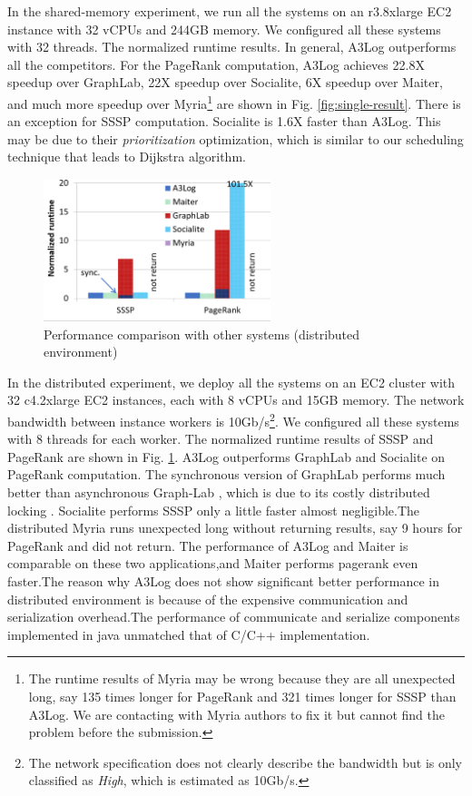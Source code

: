 In the shared-memory experiment, we run all the systems on an r3.8xlarge EC2 instance with 32 vCPUs and 244GB memory. We configured all these systems with 32 threads. The normalized runtime results. In general, A3Log outperforms all the competitors. For the PageRank computation, A3Log achieves 22.8X speedup over GraphLab, 22X speedup over Socialite, 6X speedup over Maiter, and much more speedup over Myria\footnote{The runtime results of Myria may be wrong because they are all unexpected long, say 135 times longer for PageRank and 321 times longer for SSSP than A3Log. We are contacting with Myria authors to fix it but cannot find the problem before the submission.} are shown in Fig. \ref{fig:single-result}. There is an exception for SSSP computation. Socialite is 1.6X faster than A3Log. This may be due to their \emph{prioritization} optimization, which is similar to our scheduling technique that leads to Dijkstra algorithm.

\begin{figure}[!t]
	\vspace{0.0in}
	\centering
	\includegraphics[width=2.6in]{fig/dist-result}
	\vspace{-0.1in}
	\caption{Performance comparison with other systems (distributed environment)}
	\label{fig:dist-result}
	\vspace{-0.2in}
\end{figure}

In the distributed experiment, we deploy all the systems on an EC2 cluster with 32 c4.2xlarge EC2 instances, each with 8 vCPUs and 15GB memory. The network bandwidth between instance workers is 10Gb/s\footnote{The network specification does not clearly describe the bandwidth but is only classified as \emph{High}, which is estimated as 10Gb/s.}. We configured all these systems with 8 threads for each worker. The normalized runtime results of SSSP and PageRank are shown in Fig. \ref{fig:dist-result}. A3Log outperforms GraphLab and Socialite on PageRank computation. The synchronous version of GraphLab performs much better than asynchronous Graph-Lab , which is due to its costly distributed locking \cite{Han:2015:GUB:2777598.2777604,Low:2012:DGF:2212351.2212354}. Socialite performs SSSP only a little faster almost negligible.The distributed Myria runs unexpected long without returning results, say 9 hours for PageRank and did not return. The performance of A3Log and Maiter is comparable on these two applications,and Maiter performs pagerank even faster.The reason why A3Log does not show significant better performance in distributed environment is because of the expensive communication and serialization overhead.The performance of communicate and serialize components implemented in java unmatched that of C/C++ implementation. 
